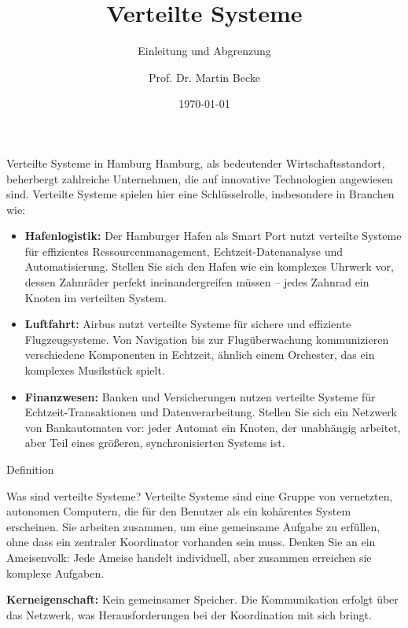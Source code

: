 \documentclass{beamer}
\title{Verteilte Systeme}
\subtitle{Einleitung und Abgrenzung}
\author{Prof. Dr. Martin Becke}
\date{\today}
\begin{document}
\begin{frame}
    \titlepage
\end{frame}

\begin{frame}{Verteilte Systeme in Hamburg}
    Hamburg, als bedeutender Wirtschaftsstandort, beherbergt zahlreiche Unternehmen, die auf innovative Technologien angewiesen sind. Verteilte Systeme spielen hier eine Schlüsselrolle, insbesondere in Branchen wie:

    \begin{itemize}
        \item \textbf{Hafenlogistik:} Der Hamburger Hafen als Smart Port nutzt verteilte Systeme für effizientes Ressourcenmanagement, Echtzeit-Datenanalyse und Automatisierung. Stellen Sie sich den Hafen wie ein komplexes Uhrwerk vor, dessen Zahnräder perfekt ineinandergreifen müssen – jedes Zahnrad ein Knoten im verteilten System.
        \item \textbf{Luftfahrt:} Airbus nutzt verteilte Systeme für sichere und effiziente Flugzeugsysteme.  Von Navigation bis zur Flugüberwachung kommunizieren verschiedene Komponenten in Echtzeit, ähnlich einem Orchester, das ein komplexes Musikstück spielt.
        \item \textbf{Finanzwesen:} Banken und Versicherungen nutzen verteilte Systeme für Echtzeit-Transaktionen und Datenverarbeitung. Stellen Sie sich ein Netzwerk von Bankautomaten vor: jeder Automat ein Knoten, der unabhängig arbeitet, aber Teil eines größeren, synchronisierten Systems ist.
    \end{itemize}

\end{frame}


\begin{frame}{Definition}

    \begin{block}{Was sind verteilte Systeme?}
    Verteilte Systeme sind eine Gruppe von vernetzten, autonomen Computern, die für den Benutzer als ein kohärentes System erscheinen. Sie arbeiten zusammen, um eine gemeinsame Aufgabe zu erfüllen, ohne dass ein zentraler Koordinator vorhanden sein muss.  Denken Sie an ein Ameisenvolk: Jede Ameise handelt individuell, aber zusammen erreichen sie komplexe Aufgaben.
    \end{block}

    \textbf{Kerneigenschaft:} Kein gemeinsamer Speicher.  Die Kommunikation erfolgt über das Netzwerk, was Herausforderungen bei der Koordination mit sich bringt.

\end{frame}
\end{document}
